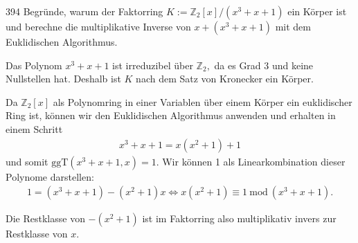 \begin{algebraUE}{394}
  Begründe, warum der Faktorring $K := \mathbb{Z}_2[x]/(x^3 + x + 1)$ ein Körper ist und berechne die multiplikative Inverse von $x + (x^3 + x + 1)$ mit dem Euklidischen Algorithmus.

\end{algebraUE}

\begin{solution}
  Das Polynom $x^3 + x + 1$ ist irreduzibel über $\mathbb{Z}_2,$ da es Grad 3 und keine Nullstellen hat. Deshalb ist $K$ nach dem Satz von Kronecker ein Körper.

  Da $\mathbb{Z}_2[x]$ als Polynomring in einer Variablen über einem Körper ein euklidischer Ring ist, können wir den Euklidischen Algorithmus anwenden und erhalten in einem Schritt
  \begin{align}
x^3 + x + 1 = x(x^2 + 1) + 1
\end{align}
und somit $\mathrm{ggT}(x^3 + x + 1, x) = 1.$ Wir können 1 als Linearkombination dieser Polynome darstellen:
\begin{align}
    1 = (x^3 + x + 1) - (x^2 + 1)x \Longleftrightarrow x(x^2 + 1) \equiv 1 \mathrm{~mod~} (x^3 + x + 1).
\end{align}

Die Restklasse von $-(x^2+1)$ ist im Faktorring also multiplikativ invers zur Restklasse von $x$.
\end{solution}

